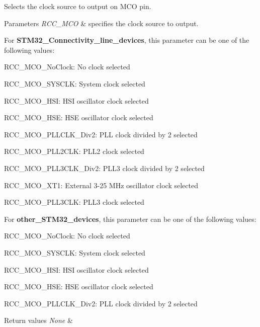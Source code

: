 Selects the clock source to output on M\+CO pin. 


\begin{DoxyParams}{Parameters}
{\em R\+C\+C\+\_\+\+M\+CO} & specifies the clock source to output.\\
\hline
\end{DoxyParams}
For {\bfseries S\+T\+M32\+\_\+\+Connectivity\+\_\+line\+\_\+devices}, this parameter can be one of the following values\+: \begin{DoxyItemize}
\item R\+C\+C\+\_\+\+M\+C\+O\+\_\+\+No\+Clock\+: No clock selected \item R\+C\+C\+\_\+\+M\+C\+O\+\_\+\+S\+Y\+S\+C\+LK\+: System clock selected \item R\+C\+C\+\_\+\+M\+C\+O\+\_\+\+H\+SI\+: H\+SI oscillator clock selected \item R\+C\+C\+\_\+\+M\+C\+O\+\_\+\+H\+SE\+: H\+SE oscillator clock selected \item R\+C\+C\+\_\+\+M\+C\+O\+\_\+\+P\+L\+L\+C\+L\+K\+\_\+\+Div2\+: P\+LL clock divided by 2 selected \item R\+C\+C\+\_\+\+M\+C\+O\+\_\+\+P\+L\+L2\+C\+LK\+: P\+L\+L2 clock selected \item R\+C\+C\+\_\+\+M\+C\+O\+\_\+\+P\+L\+L3\+C\+L\+K\+\_\+\+Div2\+: P\+L\+L3 clock divided by 2 selected \item R\+C\+C\+\_\+\+M\+C\+O\+\_\+\+X\+T1\+: External 3-\/25 M\+Hz oscillator clock selected \item R\+C\+C\+\_\+\+M\+C\+O\+\_\+\+P\+L\+L3\+C\+LK\+: P\+L\+L3 clock selected\end{DoxyItemize}
For {\bfseries other\+\_\+\+S\+T\+M32\+\_\+devices}, this parameter can be one of the following values\+: \begin{DoxyItemize}
\item R\+C\+C\+\_\+\+M\+C\+O\+\_\+\+No\+Clock\+: No clock selected \item R\+C\+C\+\_\+\+M\+C\+O\+\_\+\+S\+Y\+S\+C\+LK\+: System clock selected \item R\+C\+C\+\_\+\+M\+C\+O\+\_\+\+H\+SI\+: H\+SI oscillator clock selected \item R\+C\+C\+\_\+\+M\+C\+O\+\_\+\+H\+SE\+: H\+SE oscillator clock selected \item R\+C\+C\+\_\+\+M\+C\+O\+\_\+\+P\+L\+L\+C\+L\+K\+\_\+\+Div2\+: P\+LL clock divided by 2 selected\end{DoxyItemize}

\begin{DoxyRetVals}{Return values}
{\em None} & \\
\hline
\end{DoxyRetVals}


